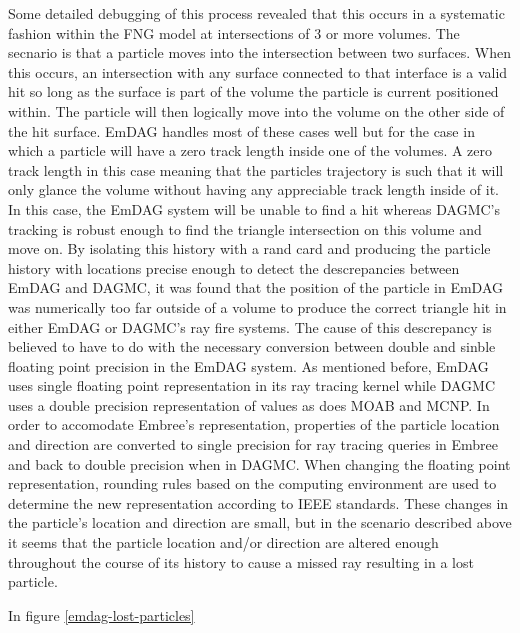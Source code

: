 \documentclass[10pt, a4paper]{article}
\begin{document}
Some detailed debugging of this process revealed that this occurs in a systematic fashion within the FNG model at intersections of 3 or more volumes. The secnario is that a particle moves into the intersection between two surfaces. When this occurs, an intersection with any surface connected to that interface is a valid hit so long as the surface is part of the volume the particle is current positioned within. The particle will then logically move into the volume on the other side of the hit surface. EmDAG handles most of these cases well but for the case in which a particle will have a zero track length inside one of the volumes. A zero track length in this case meaning that the particles trajectory is such that it will only glance the volume without having any appreciable track length inside of it. In this case, the EmDAG system will be unable to find a hit whereas DAGMC's tracking is robust enough to find the triangle intersection on this volume and move on. By isolating this history with a rand card and producing the particle history with locations precise enough to detect the descrepancies between EmDAG and DAGMC, it was found that the position of the particle in EmDAG was numerically too far outside of a volume to produce the correct triangle hit in either EmDAG or DAGMC's ray fire systems. The cause of this descrepancy is believed to have to do with the necessary conversion between double and sinble floating point precision in the EmDAG system. As mentioned before, EmDAG uses single floating point representation in its ray tracing kernel while DAGMC uses a double precision representation of values as does MOAB and MCNP. In order to accomodate Embree's representation, properties of the particle location and direction are converted to single precision for ray tracing queries in Embree and back to double precision when in DAGMC. When changing the floating point representation, rounding rules based on the computing environment are used to determine the new representation according to IEEE standards. \cite{IEEE754_2008} These changes in the particle's location and direction are small, but in the scenario described above it seems that the particle location and/or direction are altered enough throughout the course of its history to cause a missed ray resulting in a lost particle.

In figure \ref{emdag-lost-particles} 
\end{document}
